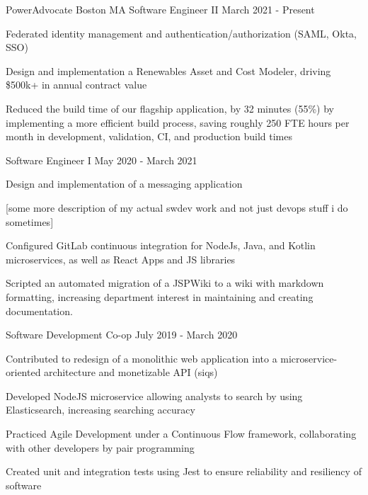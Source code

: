 
\begin{cventries}
\cventrythreepositions
    {PowerAdvocate}
    {Boston MA}
    {Software Engineer II} %
    {March 2021 - Present} %
    {
        \begin{cvitems} %
            \item {Federated identity management and authentication/authorization (SAML, Okta, SSO)}
            \item {Design and implementation a Renewables Asset and Cost Modeler, driving \$500k+ in annual contract value}
            \item {Reduced the build time of our flagship application, by 32 minutes (55\%) by implementing a more efficient build process, saving roughly 250 FTE hours per month in development, validation, CI, and production build times}
        \end{cvitems}
    }
    {Software Engineer I}
    {May 2020 - March 2021}
    {
      \begin{cvitems} %
        \item {Design and implementation of a messaging application}
        \item {[some more description of my actual swdev work and not just devops stuff i do sometimes]}
        \item {Configured GitLab continuous integration for NodeJs, Java, and Kotlin microservices, as well as React Apps and JS libraries}
        \item {Scripted an automated migration of a JSPWiki to a wiki with markdown formatting, increasing department interest in maintaining and creating documentation.}
      \end{cvitems}
    }
    {Software Development Co-op}
    {July 2019 - March 2020}
    {
      \begin{cvitems} %
        \item {Contributed to redesign of a monolithic web application into a microservice-oriented architecture and monetizable API (siqs)}
        \item {Developed NodeJS microservice allowing analysts to search by using Elasticsearch, increasing searching accuracy}
        \item {Practiced Agile Development under a Continuous Flow framework, collaborating with other developers by pair programming}
        \item {Created unit and integration tests using Jest to ensure reliability and resiliency of software}
      \end{cvitems}
    }


\end{cventries}
